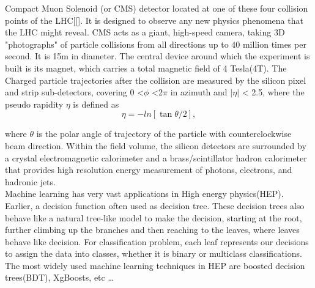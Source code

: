 Compact Muon Solenoid (or CMS) detector located at one of these four collision points of the LHC[[\cite{15-20}]. It is designed to observe any new physics phenomena that the LHC might reveal. CMS acts as a giant, high-speed camera, taking 3D "photographs" of particle collisions from all directions up to 40 million times per second. It is 15m in diameter. The central device around which the experiment is built is its magnet, which carries a total magnetic field of 4 Tesla(4T). The Charged particle trajectories after the collision are measured by the silicon pixel and strip sub-detectors, covering 0 <$\phi$ <2$\pi$ in azimuth and $|\eta|$ < 2.5, where the pseudo rapidity $\eta$ is defined as 
 \begin{equation*}
     \eta = -ln[\tan \theta/2],
 \end{equation*}
 
 where $\theta$ is the polar angle of trajectory of the particle with counterclockwise beam direction. Within the field
volume, the silicon detectors are surrounded by a crystal electromagnetic calorimeter and a brass/scintillator hadron calorimeter that provides high resolution energy measurement of photons, electrons, and hadronic jets.\\

Machine learning has very vast applications in High energy physics(HEP). Earlier, a decision function often used as decision tree. These decision trees also behave like a natural tree-like model to make the decision, starting at the root, further climbing up the branches and then reaching to the leaves, where leaves behave like decision. For classification problem, each leaf represents our decisions to assign the data into classes, whether it is binary or multiclass classifications\cite{7-8}. The most widely used machine learning techniques in HEP are boosted decision trees(BDT), XgBoosts, etc \dots\\



